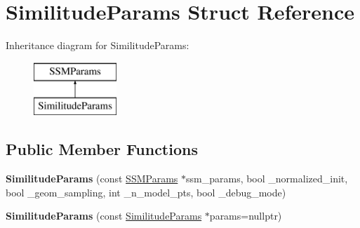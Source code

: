 \hypertarget{structSimilitudeParams}{\section{Similitude\-Params Struct Reference}
\label{structSimilitudeParams}
}
Inheritance diagram for Similitude\-Params\-:\begin{figure}[H]
\begin{center}
\leavevmode
\includegraphics[height=2.000000cm]{structSimilitudeParams}
\end{center}
\end{figure}
\subsection*{Public Member Functions}
\begin{DoxyCompactItemize}
\item 
\hypertarget{structSimilitudeParams_abe5971a580d2c18613d6e20f0a9142ee}{{\bfseries Similitude\-Params} (const \hyperlink{structSSMParams}{S\-S\-M\-Params} $\ast$ssm\-\_\-params, bool \-\_\-normalized\-\_\-init, bool \-\_\-geom\-\_\-sampling, int \-\_\-n\-\_\-model\-\_\-pts, bool \-\_\-debug\-\_\-mode)}\label{structSimilitudeParams_abe5971a580d2c18613d6e20f0a9142ee}

\item 
\hypertarget{structSimilitudeParams_a8ffcc9cd30156ae97de4a84c37542940}{{\bfseries Similitude\-Params} (const \hyperlink{structSimilitudeParams}{Similitude\-Params} $\ast$params=nullptr)}\label{structSimilitudeParams_a8ffcc9cd30156ae97de4a84c37542940}

\end{DoxyCompactItemize}
